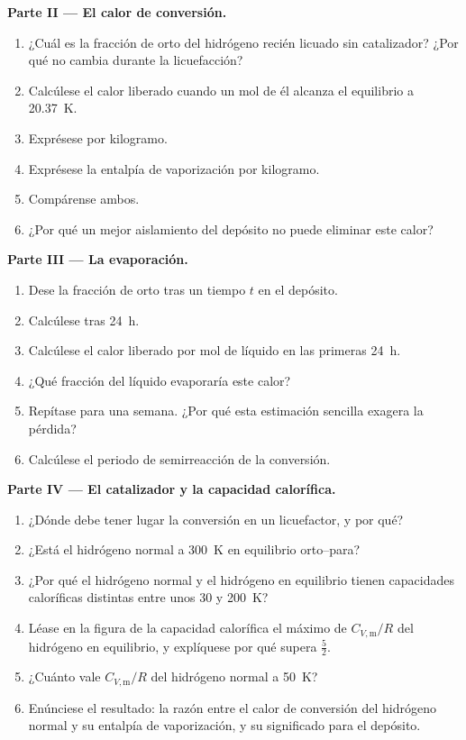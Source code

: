 \begin{problem}
\medskip\noindent\textbf{Parte II --- El calor de conversión.}
\begin{enumerate}[resume]
  \item ¿Cuál es la fracción de orto del hidrógeno recién licuado sin
        catalizador? ¿Por qué no cambia durante la licuefacción?
  \item Calcúlese el calor liberado cuando un mol de él alcanza el equilibrio a
        \qty{20.37}{K}.
  \item Exprésese por kilogramo.
  \item Exprésese la entalpía de vaporización por kilogramo.
  \item Compárense ambos.
  \item ¿Por qué un mejor aislamiento del depósito no puede eliminar este calor?
\end{enumerate}

\medskip\noindent\textbf{Parte III --- La evaporación.}
\begin{enumerate}[resume]
  \item Dese la fracción de orto tras un tiempo $t$ en el depósito.
  \item Calcúlese tras \qty{24}{h}.
  \item Calcúlese el calor liberado por mol de líquido en las primeras \qty{24}{h}.
  \item ¿Qué fracción del líquido evaporaría este calor?
  \item Repítase para una semana. ¿Por qué esta estimación sencilla exagera la pérdida?
  \item Calcúlese el periodo de semirreacción de la conversión.
\end{enumerate}

\medskip\noindent\textbf{Parte IV --- El catalizador y la capacidad calorífica.}
\begin{enumerate}[resume]
  \item ¿Dónde debe tener lugar la conversión en un licuefactor, y por qué?
  \item ¿Está el hidrógeno normal a \qty{300}{K} en equilibrio orto--para?
  \item ¿Por qué el hidrógeno normal y el hidrógeno en equilibrio tienen capacidades caloríficas distintas
        entre unos 30 y \qty{200}{K}?
  \item Léase en la figura de la capacidad calorífica el máximo de $C_{V,\mathrm m}/R$ del hidrógeno
        en equilibrio, y explíquese por qué supera $\frac52$.
  \item ¿Cuánto vale $C_{V,\mathrm m}/R$ del hidrógeno normal a \qty{50}{K}?
  \item Enúnciese el resultado: la razón entre el calor de conversión del hidrógeno normal
        y su entalpía de vaporización, y su significado para el depósito.
\end{enumerate}
\end{problem}
